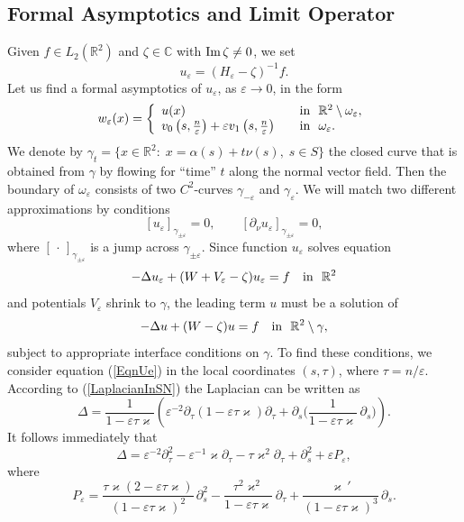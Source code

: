 \documentclass[graybox]{svmult}
\renewcommand{\Im}{\mathop{\rm Im}}
\renewcommand{\kappa}{\varkappa}
\newcommand{\Real}{\mathbb R}
\newcommand{\eps}{\varepsilon}
\newcommand\nep{\textstyle\frac n\eps}
\newcommand{\eqref}[1]{(\ref{#1})}
\begin{document}
\subsection{Formal Asymptotics and Limit Operator}
Given $f\in L_2(\Real^2)$ and $\zeta\in \mathbb{C}$ with  $\Im\zeta\neq0$, we set
\begin{equation}\label{Ueps}
u_\eps=(H_\eps-\zeta)^{-1}f.
\end{equation}
Let us find a formal asymptotics of $u_\eps$, as $\eps\to 0$, in the form
\begin{equation}\label{AsymptoticsWe}
w_\eps(x)=
\left\{
  \begin{array}{ll}
    u(x)&\quad \hbox{in \ }\Real^2\setminus \omega_\eps, \\
    v_0\left(s,\nep\right)+\eps v_1\left(s,\nep\right)
&\quad \hbox{in \ } \omega_\eps.
  \end{array}
\right.
\end{equation}
We denote by $\gamma_t=\{x\in\Real^2\colon\; x=\alpha(s)+t\nu(s), \; s\in S\}$ the closed curve that is obtained from $\gamma$ by flowing for ``time'' $t$ along the normal vector field. Then the boundary of $\omega_\eps$ consists of two $C^2$-curves $\gamma_{-\eps}$ and $\gamma_{\eps}$.
We will match two different approximations by conditions
\begin{equation}\label{MatchingCnds}
  [u_\eps]_{\gamma_{\pm\eps}}=0, \qquad [\partial_\nu u_\eps]_{\gamma_{\pm\eps}}=0,
\end{equation}
where $[\,\cdot\,]_{\gamma_{\pm\eps}}$ is a jump  across $\gamma_{\pm\eps}$.
Since function $u_\eps$ solves equation
\begin{equation}\label{EqnUe}
-\Delta u_\eps +(W+V_\eps-\zeta) u_\eps= f\quad \hbox{in \ } \Real^2
\end{equation}
and potentials $V_\eps$ shrink to $\gamma$,
the leading term $u$ must be a solution of
$$
-\Delta u+(W-\zeta)u= f \quad \hbox{in \ } \Real^2\setminus \gamma,
$$
subject to appropriate interface conditions on $\gamma$. To find these conditions, we consider equation \eqref{EqnUe} in the local coordinates $(s,\tau)$, where $\tau=n/\eps$.
According to \eqref{LaplacianInSN} the Laplacian
can be written as
\begin{equation}
  \Delta =\frac1{1-\eps \tau\kappa}\left( \eps^{-2}\partial_\tau
(1-\eps \tau\kappa)\partial_\tau +\partial_s
\Big(\frac1{1-\eps \tau\kappa}\,\partial_s\Big)\right).
\end{equation}
It follows immediately that
$$
\Delta= \eps^{-2}\partial^2_\tau-\eps^{-1}\kappa\partial_\tau-\tau \kappa^2\partial_\tau+\partial^2_s+\eps P_\eps,
$$
where
$$
  P_\eps=\frac{\tau\kappa(2-\eps\tau\kappa)}{(1-\eps \tau\kappa)^2}\,\partial^2_s-\frac{\tau^2\kappa^2}{1-\eps \tau\kappa}\,\partial_\tau+\frac{\kappa\,'}{(1-\eps \tau\kappa)^3}\,\partial_s.
$$
\end{document}

